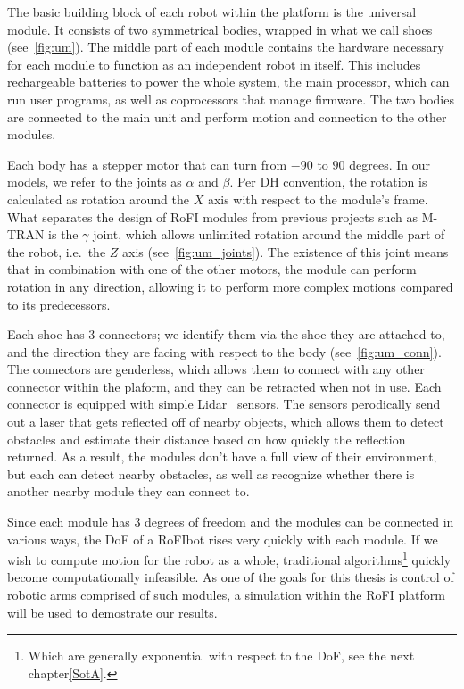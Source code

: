 The basic building block of each robot within the platform is the universal module. It consists of two symmetrical bodies, wrapped in what we call shoes (see~\ref{fig:um}). The middle part of each module contains the hardware necessary for each module to function as an independent robot in itself. This includes rechargeable batteries to power the whole system, the main processor, which can run user programs, as well as coprocessors that manage firmware. The two bodies are connected to the main unit and perform motion and connection to the other modules.

Each body has a stepper motor that can turn from $-90$ to $90$ degrees. In our models, we refer to the joints as $\alpha$ and $\beta$. Per DH convention, the rotation is calculated as rotation around the $X$ axis with respect to the module's frame. What separates the design of RoFI modules from previous projects such as M-TRAN is the $\gamma$ joint, which allows unlimited rotation around the middle part of the robot, i.e.\ the $Z$ axis (see~\ref{fig:um_joints}). The existence of this joint means that in combination with one of the other motors, the module can perform rotation in any direction, allowing it to perform more complex motions compared to its predecessors.

Each shoe has 3 connectors; we identify them via the shoe they are attached to, and the direction they are facing with respect to the body (see~\ref{fig:um_conn}). The connectors are genderless, which allows them to connect with any other connector within the plaform, and they can be retracted when not in use. Each connector is equipped with simple Lidar~\cite{Lidar} sensors. The sensors perodically send out a laser that gets reflected off of nearby objects, which allows them to detect obstacles and estimate their distance based on how quickly the reflection returned. As a result, the modules don't have a full view of their environment, but each can detect nearby obstacles, as well as recognize whether there is another nearby module they can connect to.

Since each module has 3 degrees of freedom and the modules can be connected in various ways, the DoF of a RoFIbot rises very quickly with each module. If we wish to compute motion for the robot as a whole, traditional algorithms\footnote{Which are generally exponential with respect to the DoF, see the next chapter\ref{SotA}.} quickly become computationally infeasible. As one of the goals for this thesis is control of robotic arms comprised of such modules, a simulation within the RoFI platform will be used to demostrate our results.

